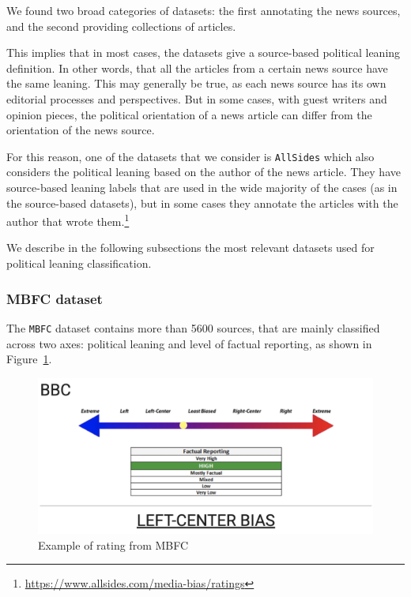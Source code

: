 We found two broad categories of datasets: the first annotating the news sources, and the second providing collections of articles.

This implies that in most cases, the datasets give a source-based political leaning definition. In other words, that all the articles from a certain news source have the same leaning.
This may generally be true, as each news source has its own editorial processes and perspectives. But in some cases, with guest writers and opinion pieces, the political orientation of a news article can differ from the orientation of the news source.

For this reason, one of the datasets that we consider is \texttt{AllSides} which also considers the political leaning based on the author of the news article. They have source-based leaning labels that are used in the wide majority of the cases (as in the source-based datasets), but in some cases they annotate the articles with the author that wrote them.\footnote{\url{https://www.allsides.com/media-bias/ratings}}




We describe in the following subsections the most relevant datasets used for political leaning classification.



\subsubsection{MBFC dataset}

The \texttt{MBFC} dataset contains more than 5600 sources, that are mainly classified across two axes: political leaning and level of factual reporting, as shown in Figure~\ref{fig:mbfc_bbc}.

\begin{figure}[!htbp]
    \centering
    \includegraphics[width=\linewidth]{figures/mbfc_bbc.png}
    \caption{Example of rating from MBFC}
    \label{fig:mbfc_bbc}
\end{figure}

